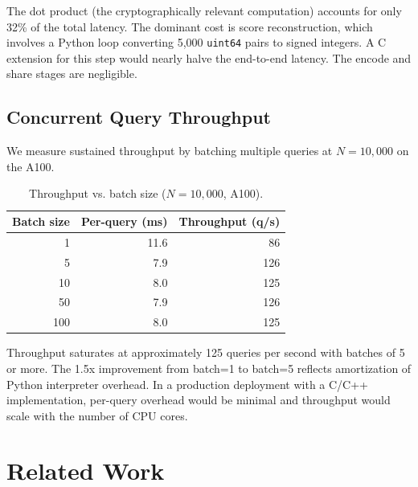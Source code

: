 \documentclass[11pt]{article}
\begin{document}
The dot product (the cryptographically relevant computation) accounts for only 32\% of the total latency. The dominant cost is score reconstruction, which involves a Python loop converting 5{,}000 \texttt{uint64} pairs to signed integers. A C extension for this step would nearly halve the end-to-end latency. The encode and share stages are negligible.

\subsection{Concurrent Query Throughput}

We measure sustained throughput by batching multiple queries at $N = 10{,}000$ on the A100.

\begin{table}[h]
\centering
\caption{Throughput vs. batch size ($N = 10{,}000$, A100).}
\label{tab:throughput}
\begin{tabular}{rrr}
\toprule
Batch size & Per-query (ms) & Throughput (q/s) \\
\midrule
1 & 11.6 & 86 \\
5 & 7.9 & 126 \\
10 & 8.0 & 125 \\
50 & 7.9 & 126 \\
100 & 8.0 & 125 \\
\bottomrule
\end{tabular}
\end{table}

Throughput saturates at approximately 125 queries per second with batches of 5 or more. The 1.5x improvement from batch=1 to batch=5 reflects amortization of Python interpreter overhead. In a production deployment with a C/C++ implementation, per-query overhead would be minimal and throughput would scale with the number of CPU cores.


\section{Related Work}
\label{sec:related}
\end{document}
